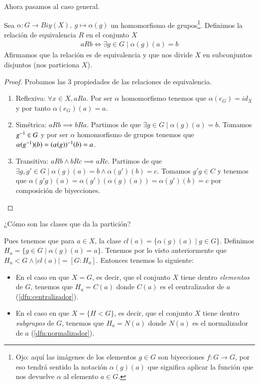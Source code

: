 Ahora pasamos al caso general.

\begin{pro}
	Sea $\alpha: G \to Biy(X),\ g \mapsto \alpha(g)$ un homomorfismo de grupos\footnote{Ojo: aquí las imágenes de los elementos $g \in G$ son biyecciones $f:G \to G$, por eso tendrá sentido la notación $\alpha(g)(a)$ que significa aplicar la función que nos devuelve $\alpha$ al elemento $a \in G$.}. Definimos la relación de equivalencia $R$ en el conjunto $X$
	\begin{align}
	aRb \iff \exists g \in G \mid \alpha(g)(a) = b
	\end{align}
	Afirmamos que la relación es de equivalencia y que nos divide $X$ en subconjuntos disjuntos (nos particiona $X$).
\end{pro}

\begin{proof}Probamos las 3 propiedades de las relaciones de equivalencia.
	\begin{enumerate}
		\item Reflexiva: $\forall x \in X, a R a$. Por ser $\alpha$ homomorfismo tenemos que $\alpha(e_G) = id_X$ y por tanto $\alpha(e_G)(a) = a$.
		\item Simétrica: $aRb \implies bRa$. Partimos de que $\exists g \in G \mid \alpha(g)(a) = b$. Tomamos $g^{-1} \in G$ y por ser $\alpha$ homomorfismo de grupos tenemos que $\alpha(g^{-1})(b) = (\alpha(g))^{-1}(b) = a$.
		\item Transitiva: $aRb \land bRc \implies aRc$. Partimos de que $\exists g, g' \in G \mid \alpha(g)(a) = b \land \alpha(g')(b) = c$. Tomamos $g'g \in C$ y tenemos que $\alpha(g'g)(a) = \alpha(g')(\alpha(g)(a)) = \alpha(g')(b) = c$ por composición de biyecciones.
	\end{enumerate}
\end{proof}

¿Cómo son las clases que da la partición?

Pues tenemos que para $a \in X$, la clase $cl(a) = \{\alpha(g)(a) \mid g \in G\}$. Definimos $H_a = \{g \in G \mid \alpha(g)(a) = a\}$. Tenemos por lo visto anteriormente que $H_a < G \land |cl(a)| = [G:H_a]$. Entonces tenemos lo siguiente:
\begin{itemize}
	\item En el caso en que $X = G$, es decir, que el conjunto $X$ tiene dentro \textit{elementos} de $G$, tenemos que $H_a = C(a)$ donde $C(a)$ es el centralizador de $a$ (\autoref{dfn:centralizador}).
	\item En el caso en que $X = \{H < G\}$, es decir, que el conjunto $X$ tiene dentro \textit{subgrupos} de $G$, tenemos que $H_a = N(a)$ donde $N(a)$ es el normalizador de $a$ (\autoref{dfn:normalizador}).
\end{itemize}

